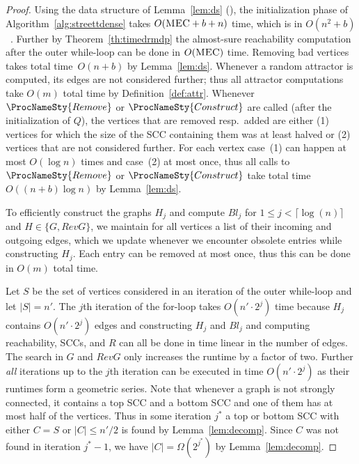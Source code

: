 \documentclass[11pt,letterpaper]{article}
\newcommand{\set}[1]{\{#1\}}
\newcommand{\lu}{\textup{(}}
\newcommand{\ru}{\textup{)}\xspace}
\newcommand{\upbr}[1]{\lu #1\ru}
\newcommand{\scc}{C\xspace}
\newcommand{\rev}{\mathit{RevG}}
\newcommand{\blue}{\mathit{Bl}}
\newcommand{\remove}{\ProcNameSty{Remove}}
\newcommand{\construct}{\ProcNameSty{Construct}}
\begin{document}
\begin{proof}
	Using the data structure of Lemma~\ref{lem:ds} (\cite{HenzingerT96}),
	the initialization phase of Algorithm~\ref{alg:streettdense} takes 
	$O(\textsc{MEC} + b + n)$ time, which is in $O(n^2 + b)$~\cite{ChatterjeeH14}.
	Further by Theorem~\ref{th:timedrmdp} the almost-sure reachability computation
	after the outer while-loop can be done in $O(\textsc{MEC})$ time. 
	Removing bad vertices takes total time~$O(n + b)$ by Lemma~\ref{lem:ds}. 
	Whenever a random attractor is computed, its edges are not considered further;
	thus all attractor computations take $O(m)$ total time by Definition~\ref{def:attr}.
	Whenever $\remove$ or $\construct$ are called (after the
	initialization of $Q$), the vertices that are removed resp.\ added are either
	\upbr{1} vertices for which the size of the SCC containing them was at least halved
	or \upbr{2} vertices that are not considered further. For each vertex 
	case~\upbr{1} can happen at most $O(\log n)$ times and case~\upbr{2} at 
	most once, thus all calls to $\remove$ or $\construct$ take
	total time $O((n+b)\log n)$ by Lemma~\ref{lem:ds}.
	
	To efficiently construct the graphs $H_j$ and compute $\blue_j$
	for $1 \le j < \lceil \log(n) \rceil$ and $H \in \set{G,\rev}$, we maintain 
	for all vertices a list of their incoming and outgoing edges, which we 
	update whenever we encounter obsolete entries while constructing $H_j$. 
	Each entry can be removed at most once, thus this can be done in $O(m)$ total time.
	
	Let $S$ be the set of vertices considered in an iteration of the outer while-loop
	and let $\lvert S \rvert = n'$.
	The $j$th iteration of the for-loop takes $O(n' \cdot 2^j)$ time
	because $H_j$ contains $O(n' \cdot 2^j)$ edges and constructing $H_j$ and $\blue_j$
	and computing reachability, SCCs, and $R$ can all be done in time linear in the 
	number of edges. The search in $G$ and $\rev$ only increases the runtime 
	by a factor of two. Further \emph{all} iterations up to the $j$th iteration
	can be executed in time $O(n' \cdot 2^j)$ as their runtimes 
	form a geometric series.
	Note that whenever a graph is not strongly connected, it contains a top SCC and 
	a bottom SCC and one of them has at most half of the vertices. Thus in some
	iteration $j^*$ a top or bottom SCC with either $\scc = S$ or 
	$\lvert \scc \rvert \le n' /2$ is found by Lemma~\ref{lem:decomp}.
	Since $\scc$ was not found 
	in iteration $j^*-1$, we have $\lvert \scc \rvert = \Omega(2^{j^*})$ by
	Lemma~\ref{lem:decomp}.
	

\end{proof}
\end{document}
